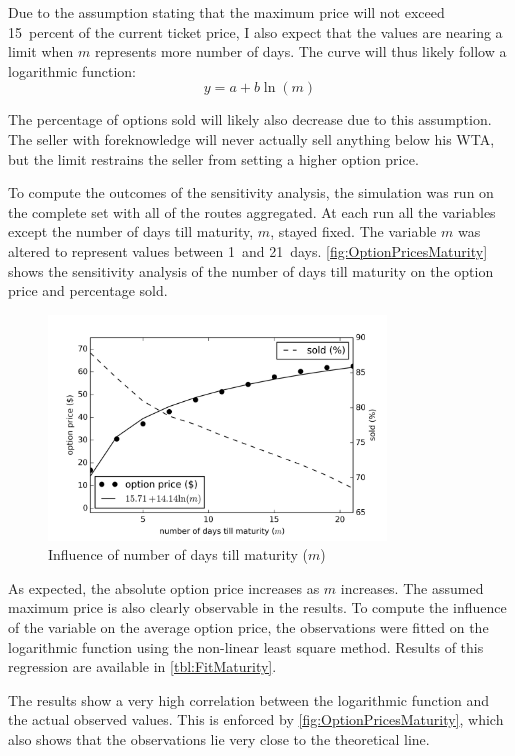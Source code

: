Due to the assumption stating that the maximum price will not exceed 15~percent of the current ticket price, I also expect that the values are nearing a limit when $m$ represents more number of days. The curve will thus likely follow a logarithmic function:
$$ y = a + b \ln(m) $$

The percentage of options sold will likely also decrease due to this assumption. The seller with foreknowledge will never actually sell anything below his WTA, but the limit restrains the seller from setting a higher option price.

To compute the outcomes of the sensitivity analysis, the simulation was run on the complete set with all of the routes aggregated. At each run all the variables except the number of days till maturity, $m$, stayed fixed. The variable $m$ was altered to represent values between 1~and 21~days. \autoref{fig:OptionPricesMaturity} shows the sensitivity analysis of the number of days till maturity on the option price and percentage sold. 


\begin{figure}
    \centering
    \includegraphics[width=0.8\textwidth]{figures/OptionPricesMaturity}
    \caption{Influence of number of days till maturity ($m$)}
    \label{fig:OptionPricesMaturity}
\end{figure}


As expected, the absolute option price increases as $m$ increases. The assumed maximum price is also clearly observable in the results. To compute the influence of the variable on the average option price, the observations were fitted on the logarithmic function using the non-linear least square method. Results of this regression are available in \autoref{tbl:FitMaturity}.

The results show a very high correlation between the logarithmic function and the actual observed values. This is enforced by \autoref{fig:OptionPricesMaturity}, which also shows that the observations lie very close to the theoretical line.


